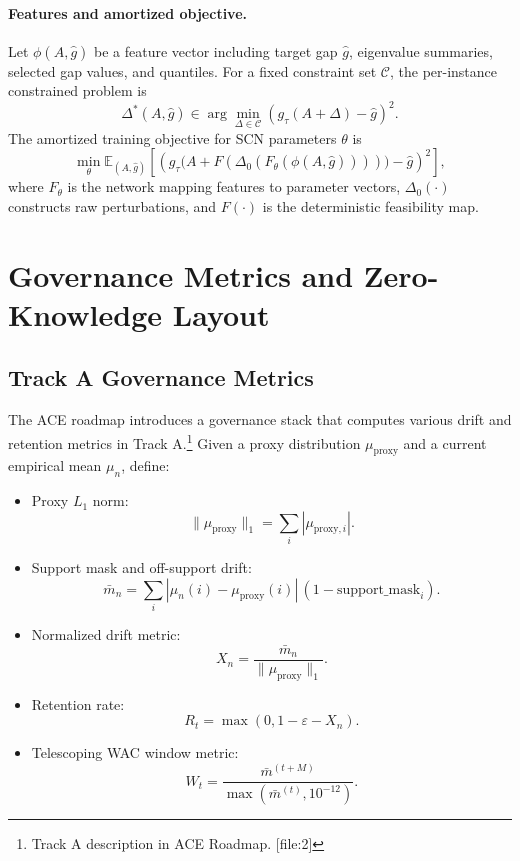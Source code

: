 \documentclass[11pt]{article}
\begin{document}
\paragraph{Features and amortized objective.} Let \(\phi(A,\hat g)\) be a feature vector including target gap \(\hat g\), eigenvalue summaries, selected gap values, and quantiles. For a fixed constraint set \(\mathcal{C}\), the per-instance constrained problem is
\[
\Delta^*(A,\hat g)
  \in \arg\min_{\Delta\in\mathcal{C}}\left(g_\tau(A+\Delta) - \hat g\right)^2.
\]
The amortized training objective for SCN parameters \(\theta\) is
\[
\min_\theta \mathbb{E}_{(A,\hat g)}\left[
  \left(
    g_\tau\bigl(A + F(\Delta_0(F_\theta(\phi(A,\hat g))))\bigr) - \hat g
  \right)^2
\right],
\]
where \(F_\theta\) is the network mapping features to parameter vectors, \(\Delta_0(\cdot)\) constructs raw perturbations, and \(F(\cdot)\) is the deterministic feasibility map.

\section{Governance Metrics and Zero-Knowledge Layout}

\subsection{Track A Governance Metrics}

The ACE roadmap introduces a governance stack that computes various drift and retention metrics in Track A.\footnote{Track A description in ACE Roadmap. [file:2]} Given a proxy distribution \(\mu_{\mathrm{proxy}}\) and a current empirical mean \(\mu_n\), define:

\begin{itemize}[leftmargin=*]
  \item Proxy \(L_1\) norm:
  \[
  \|\mu_{\mathrm{proxy}}\|_1 = \sum_i |\mu_{\mathrm{proxy},i}|.
  \]
  \item Support mask and off-support drift:
  \[
  \bar m_n = \sum_i |\mu_n(i) - \mu_{\mathrm{proxy}}(i)|\,(1 - \mathrm{support\_mask}_i).
  \]
  \item Normalized drift metric:
  \[
  X_n = \frac{\bar m_n}{\|\mu_{\mathrm{proxy}}\|_1}.
  \]
  \item Retention rate:
  \[
  R_t = \max(0, 1 - \varepsilon - X_n).
  \]
  \item Telescoping WAC window metric:
  \[
  W_t = \frac{\bar m^{(t+M)}}{\max(\bar m^{(t)},10^{-12})}.
  \]
\end{itemize}
\end{document}
